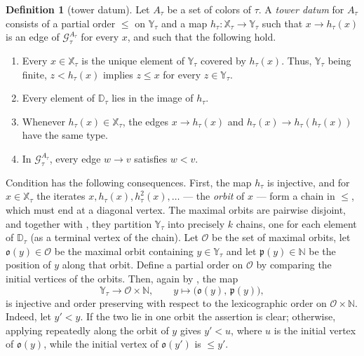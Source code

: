 \documentclass[12pt]{article}
\theoremstyle{definition}
\newtheorem{definition}[definition]{Definition}
\newcommand{\pset}{A}                  %
\newcommand{\orbs}{\mathcal{O}}
\newcommand{\orb}{\mathfrak{o}}
\newcommand{\pstn}{\mathfrak{p}}
\newcommand{\NN}{\mathbb{N}}
\newcommand{\XX}{\mathbb{X}}  %
\newcommand{\YY}{\mathbb{Y}}  %
\newcommand{\DD}{\mathbb{D}}  %
\newcommand{\Gc}{\mathcal{G}}          %
\begin{document}
\begin{definition}[tower datum]\label{def:towerdatum}
Let $\pset_\tau$ be a set of colors of $\tau$. A \emph{tower datum} for
$\pset_\tau$ consists of a partial order $\le$ on $\YY_\tau$ and a map $h_\tau :
\XX_\tau \to \YY_\tau$ such that $x \to h_\tau(x)$ is an edge of
$\Gc^{\pset_\tau}_\tau$ for every $x$, and such that the following hold.
\begin{enumerate}
\renewcommand{\theenumi}{T\arabic{enumi}}%
\renewcommand{\labelenumi}{(\theenumi)}%
\item\label{T:cover} Every $x \in \XX_\tau$ is the unique element of $\YY_\tau$ covered by $h_\tau(x)$.
Thus, $\YY_\tau$ being finite, $z < h_\tau(x)$ implies $z \le x$ for every
$z \in \YY_\tau$.
\item\label{T:onto} Every element of $\DD_\tau$ lies in the image of $h_\tau$.
\item\label{T:type} Whenever $h_\tau(x) \in \XX_\tau$, the edges $x \to h_\tau(x)$
and $h_\tau(x) \to h_\tau(h_\tau(x))$ have the same type.
\item\label{T:mono} In $\Gc^{\pset_\tau}_\tau$, every edge $w \to v$ satisfies $w < v$.
\end{enumerate}
\end{definition}

Condition  has the following consequences.
First, the map $h_\tau$ is injective, and for $x \in \XX_\tau$
the iterates $x, h_\tau(x), h_\tau^2(x),\dots$ --- the \emph{orbit} of $x$ --- form
a chain in $\le$, which must end at a diagonal vertex. The maximal orbits are pairwise disjoint, and
together with , they partition $\YY_\tau$ into precisely $k$ chains, one for
each element of $\DD_\tau$ (as a terminal vertex of the chain).
Let $\orbs$ be the set of maximal orbits, let $\orb(y) \in \orbs$ be the maximal
orbit containing $y \in \YY_\tau$ and let $\pstn(y) \in \NN$ be the position of $y$ along that orbit.
Define a partial order on $\orbs$ by comparing the initial vertices of the orbits. Then, again by , the map
\begin{equation}\label{eq:orbcoord}
   \YY_\tau \longrightarrow \orbs\times\NN,
   \qquad
   y \longmapsto \bigl(\orb(y),\,\pstn(y)\bigr) ,
\end{equation}
is injective and order preserving with respect to the lexicographic order
on $\orbs\times\NN$. Indeed, let $y' < y$. If the two lie in one orbit
the assertion is clear; otherwise, applying  repeatedly
along the orbit of $y$ gives $y' < u$, where $u$ is the initial vertex of
$\orb(y)$, while the initial vertex of $\orb(y')$ is $\le y'$.
\end{document}
